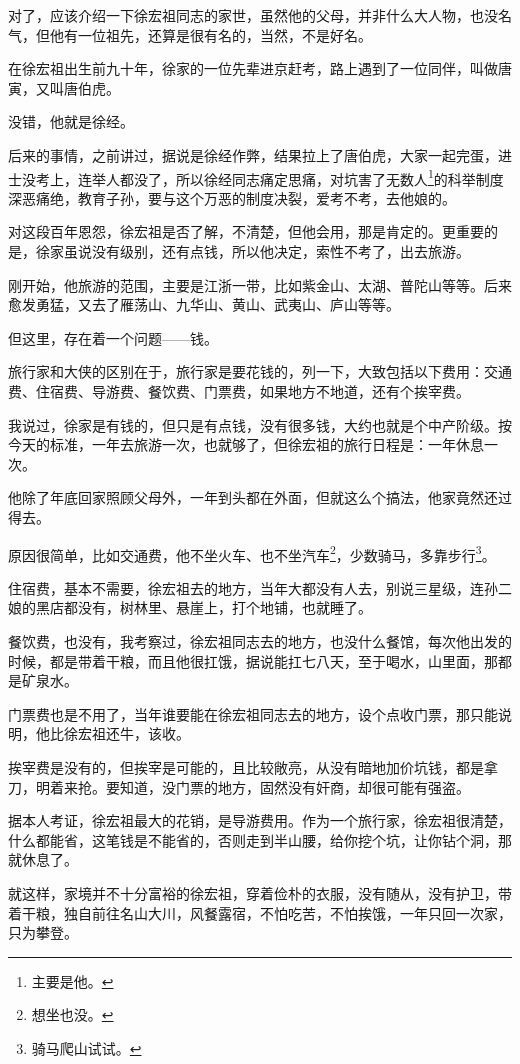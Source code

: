 \begin{multicols}{\theparacolNo}
对了，应该介绍一下徐宏祖同志的家世，虽然他的父母，并非什么大人物，也没名气，但他有一位祖先，还算是很有名的，当然，不是好名。

在徐宏祖出生前九十年，徐家的一位先辈进京赶考，路上遇到了一位同伴，叫做唐寅，又叫唐伯虎。

没错，他就是徐经。

后来的事情，之前讲过，据说是徐经作弊，结果拉上了唐伯虎，大家一起完蛋，进士没考上，连举人都没了，所以徐经同志痛定思痛，对坑害了无数人\footnote{主要是他。}的科举制度深恶痛绝，教育子孙，要与这个万恶的制度决裂，爱考不考，去他娘的。

对这段百年恩怨，徐宏祖是否了解，不清楚，但他会用，那是肯定的。更重要的是，徐家虽说没有级别，还有点钱，所以他决定，索性不考了，出去旅游。

刚开始，他旅游的范围，主要是江浙一带，比如紫金山、太湖、普陀山等等。后来愈发勇猛，又去了雁荡山、九华山、黄山、武夷山、庐山等等。

但这里，存在着一个问题——钱。

旅行家和大侠的区别在于，旅行家是要花钱的，列一下，大致包括以下费用：交通费、住宿费、导游费、餐饮费、门票费，如果地方不地道，还有个挨宰费。

我说过，徐家是有钱的，但只是有点钱，没有很多钱，大约也就是个中产阶级。按今天的标准，一年去旅游一次，也就够了，但徐宏祖的旅行日程是：一年休息一次。

他除了年底回家照顾父母外，一年到头都在外面，但就这么个搞法，他家竟然还过得去。

原因很简单，比如交通费，他不坐火车、也不坐汽车\footnote{想坐也没。}，少数骑马，多靠步行\footnote{骑马爬山试试。}。

住宿费，基本不需要，徐宏祖去的地方，当年大都没有人去，别说三星级，连孙二娘的黑店都没有，树林里、悬崖上，打个地铺，也就睡了。

餐饮费，也没有，我考察过，徐宏祖同志去的地方，也没什么餐馆，每次他出发的时候，都是带着干粮，而且他很扛饿，据说能扛七八天，至于喝水，山里面，那都是矿泉水。

门票费也是不用了，当年谁要能在徐宏祖同志去的地方，设个点收门票，那只能说明，他比徐宏祖还牛，该收。

挨宰费是没有的，但挨宰是可能的，且比较敞亮，从没有暗地加价坑钱，都是拿刀，明着来抢。要知道，没门票的地方，固然没有奸商，却很可能有强盗。

据本人考证，徐宏祖最大的花销，是导游费用。作为一个旅行家，徐宏祖很清楚，什么都能省，这笔钱是不能省的，否则走到半山腰，给你挖个坑，让你钻个洞，那就休息了。

就这样，家境并不十分富裕的徐宏祖，穿着俭朴的衣服，没有随从，没有护卫，带着干粮，独自前往名山大川，风餐露宿，不怕吃苦，不怕挨饿，一年只回一次家，只为攀登。


\end{multicols}
